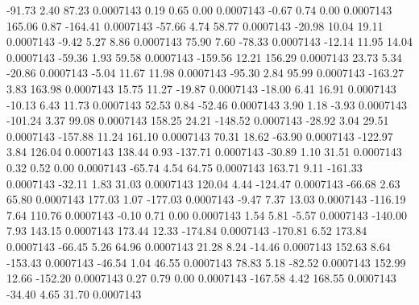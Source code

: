       -91.73        2.40       87.23     0.0007143
        0.19        0.65        0.00     0.0007143
       -0.67        0.74        0.00     0.0007143
      165.06        0.87     -164.41     0.0007143
      -57.66        4.74       58.77     0.0007143
      -20.98       10.04       19.11     0.0007143
       -9.42        5.27        8.86     0.0007143
       75.90        7.60      -78.33     0.0007143
      -12.14       11.95       14.04     0.0007143
      -59.36        1.93       59.58     0.0007143
     -159.56       12.21      156.29     0.0007143
       23.73        5.34      -20.86     0.0007143
       -5.04       11.67       11.98     0.0007143
      -95.30        2.84       95.99     0.0007143
     -163.27        3.83      163.98     0.0007143
       15.75       11.27      -19.87     0.0007143
      -18.00        6.41       16.91     0.0007143
      -10.13        6.43       11.73     0.0007143
       52.53        0.84      -52.46     0.0007143
        3.90        1.18       -3.93     0.0007143
     -101.24        3.37       99.08     0.0007143
      158.25       24.21     -148.52     0.0007143
      -28.92        3.04       29.51     0.0007143
     -157.88       11.24      161.10     0.0007143
       70.31       18.62      -63.90     0.0007143
     -122.97        3.84      126.04     0.0007143
      138.44        0.93     -137.71     0.0007143
      -30.89        1.10       31.51     0.0007143
        0.32        0.52        0.00     0.0007143
      -65.74        4.54       64.75     0.0007143
      163.71        9.11     -161.33     0.0007143
      -32.11        1.83       31.03     0.0007143
      120.04        4.44     -124.47     0.0007143
      -66.68        2.63       65.80     0.0007143
      177.03        1.07     -177.03     0.0007143
       -9.47        7.37       13.03     0.0007143
     -116.19        7.64      110.76     0.0007143
       -0.10        0.71        0.00     0.0007143
        1.54        5.81       -5.57     0.0007143
     -140.00        7.93      143.15     0.0007143
      173.44       12.33     -174.84     0.0007143
     -170.81        6.52      173.84     0.0007143
      -66.45        5.26       64.96     0.0007143
       21.28        8.24      -14.46     0.0007143
      152.63        8.64     -153.43     0.0007143
      -46.54        1.04       46.55     0.0007143
       78.83        5.18      -82.52     0.0007143
      152.99       12.66     -152.20     0.0007143
        0.27        0.79        0.00     0.0007143
     -167.58        4.42      168.55     0.0007143
      -34.40        4.65       31.70     0.0007143
